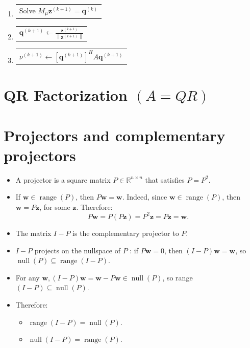 \documentclass[11pt]{book}
\begin{document}
\begin{enumerate} 
\item \begin{tabular}[t]{c} Solve $M_{\mu} \mathbf{z}^{(k+1)}=\mathbf{q}^{(k)}$ \end{tabular}
\item \begin{tabular}[t]{c} $\mathbf{q}^{(k+1)} \leftarrow \frac{\mathbf{z}^{(k+1)}}{\left\|\mathbf{z}^{(k+1)}\right\|}$ \end{tabular}
\item \begin{tabular}[t]{c} $\nu^{(k+1)} \leftarrow\left[\mathbf{q}^{(k+1)}\right]^{H} A \mathbf{q}^{(k+1)}$ \end{tabular}
\end{enumerate}




\section*{QR Factorization $(A=Q R)$}
\section*{Projectors and complementary projectors}
\begin{itemize}
  \item A projector is a square matrix $P \in \mathbb{R}^{n \times n}$ that satisfies $P = P^{2}$.

  \item If $\mathbf{w} \in \operatorname{range}(P)$, then $P \mathbf{w}=\mathbf{w}$. Indeed, since $\mathbf{w} \in \operatorname{range}(P)$, then $\mathbf{w}=P \mathbf{z}$, for some $\mathbf{z}$. Therefore:
$$P \mathbf{w}=P(P \mathbf{z})=P^{2} \mathbf{z}=P \mathbf{z}=\mathbf{w}.$$

  \item The matrix $I-P$ is the complementary projector to $P$.

  \item $I-P$ projects on the nullspace of $P$ : if $P \mathbf{w}=0$, then $(I-P) \mathbf{w}=\mathbf{w}$, so $\operatorname{null}(P) \subseteq \operatorname{range}(I-P)$.

  \item For any $\mathbf{w},(I-P) \mathbf{w}=\mathbf{w}-P \mathbf{w} \in \operatorname{null}(P)$, so range $(I-P) \subseteq \operatorname{null}(P)$.

  \item Therefore:
\begin{itemize}

\item$\operatorname{range}(I-P)=\operatorname{null}(P)$.

\item $\operatorname{null}(I-P)=\operatorname{range}(P)$.
\end{itemize}
\end{itemize}
\end{document}
